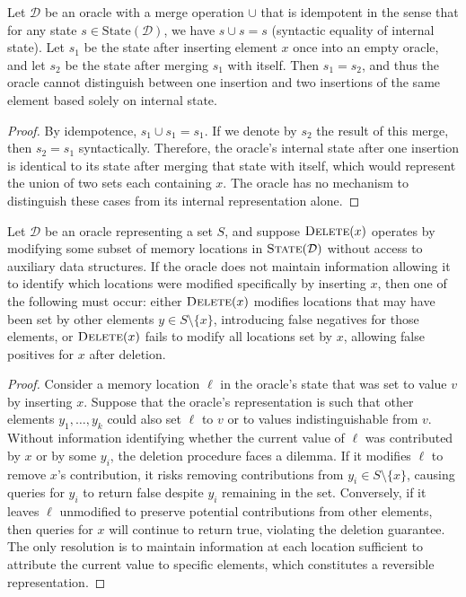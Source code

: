 \begin{lemma}
    \label{lem:indistinguishability}
    Let $\mathcal{D}$ be an oracle with a merge operation $\cup$ that is idempotent in the sense that for any state $s \in \text{State}(\mathcal{D})$, we have $s \cup s = s$ (syntactic equality of internal state). Let $s_1$ be the state after inserting element $x$ once into an empty oracle, and let $s_2$ be the state after merging $s_1$ with itself. Then $s_1 = s_2$, and thus the oracle cannot distinguish between one insertion and two insertions of the same element based solely on internal state.
\end{lemma}

\begin{proof}
    By idempotence, $s_1 \cup s_1 = s_1$. If we denote by $s_2$ the result of this merge, then $s_2 = s_1$ syntactically. Therefore, the oracle's internal state after one insertion is identical to its state after merging that state with itself, which would represent the union of two sets each containing $x$. The oracle has no mechanism to distinguish these cases from its internal representation alone.
\end{proof}

\begin{lemma}
    \label{lem:deletion-locality}
    Let $\mathcal{D}$ be an oracle representing a set $S$, and suppose $\textsc{Delete}(x)$ operates by modifying some subset of memory locations in $\textsc{State}(\mathcal{D})$ without access to auxiliary data structures. If the oracle does not maintain information allowing it to identify which locations were modified specifically by inserting $x$, then one of the following must occur: either $\textsc{Delete}(x)$ modifies locations that may have been set by other elements $y \in S \setminus \{x\}$, introducing false negatives for those elements, or $\textsc{Delete}(x)$ fails to modify all locations set by $x$, allowing false positives for $x$ after deletion.
\end{lemma}

\begin{proof}
    Consider a memory location $\ell$ in the oracle's state that was set to value $v$ by inserting $x$. Suppose that the oracle's representation is such that other elements $y_1, \ldots, y_k$ could also set $\ell$ to $v$ or to values indistinguishable from $v$. Without information identifying whether the current value of $\ell$ was contributed by $x$ or by some $y_i$, the deletion procedure faces a dilemma. If it modifies $\ell$ to remove $x$'s contribution, it risks removing contributions from $y_i \in S \setminus \{x\}$, causing queries for $y_i$ to return false despite $y_i$ remaining in the set. Conversely, if it leaves $\ell$ unmodified to preserve potential contributions from other elements, then queries for $x$ will continue to return true, violating the deletion guarantee. The only resolution is to maintain information at each location sufficient to attribute the current value to specific elements, which constitutes a reversible representation.
\end{proof}

